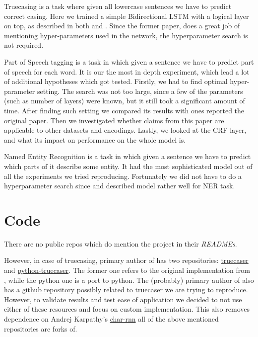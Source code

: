 \documentclass[11pt,a4paper]{article}
\begin{document}
Truecasing is a task where given all lowercase sentences we have to predict correct casing. Here we trained a simple Bidirectional LSTM with a logical layer on top, as described in both \cite{ner-and-pos-original} and \cite{susanto-etal-2016-learning}. Since the former paper, does a great job of mentioning hyper-parameters used in the network, the hyperparameter search is not required.

Part of Speech tagging is a task in which given a sentence we have to predict part of speech for each word. It is our the most in depth experiment, which lead a lot of additional hypotheses which got tested. Firstly, we had to find optimal hyper-parameter setting. The search was not too large, since a few of the parameters (such as number of layers) were known, but it still took a significant amount of time. After finding such setting we compared its results with ones reported the original paper. Then we investigated whether claims from this paper are applicable to other datasets and encodings. Lastly, we looked at the CRF layer, and what its impact on performance on the whole model is.

Named Entity Recognition is a task in which given a sentence we have to predict which parts of it describe some entity. It had the most sophisticated model out of all the experiments we tried reproducing. Fortunately we did not have to do a hyperparameter search since \cite{ner-and-pos-original} and \cite{ma-hovy-2016-end} described model rather well for NER task.

\section{Code}
There are no public repos which do mention the project in their \textit{READMEs}.

However, in case of truecasing, primary author of \cite{ner-and-pos-original} has two repositories: \href{https://github.com/mayhewsw/truecaser}{truecaser} and \href{https://github.com/mayhewsw/pytorch-truecaser}{python-truecaser}. The former one refers to the original implementation from \cite{susanto-etal-2016-learning}, while the python one is a port to python. The (probably) primary author of \cite{susanto-etal-2016-learning} also has a \href{https://github.com/raymondhs/char-rnn-truecase}{github repository} possibly related to truecaser we are trying to reproduce. However, to validate results and test ease of application we decided to not use either of these resources and focus on custom implementation. This also removes dependence on Andrej Karpathy's \href{https://github.com/karpathy/char-rnn}{char-rnn} all of the above mentioned repositories are forks of.
\end{document}
